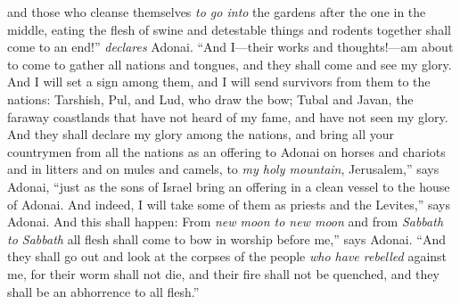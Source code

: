 \begin{biblechapter}
and those who cleanse themselves \textit{to go into} the gardens after the one in the middle, 
eating the flesh of swine 
and detestable things and rodents together shall come to an end!” \textit{declares} Adonai.
\verse “And I—their works and thoughts!—am about to come to gather all nations and tongues, 
and they shall come and see my glory.
\verse And I will set a sign among them, 
and I will send survivors from them to the nations: 
Tarshish, Pul, and Lud, who draw the bow; 
Tubal and Javan, the faraway coastlands 
that have not heard of my fame, 
and have not seen my glory.
\verse And they shall declare my glory among the nations,
\verse and bring all your countrymen from all the nations as an offering to Adonai on horses and chariots and in litters and on mules and camels, to \textit{my holy mountain}, Jerusalem,” says Adonai, “just as the sons of Israel bring an offering in a clean vessel to the house of Adonai.
\verse And indeed, I will take some of them as priests and the Levites,” says Adonai.
\verse And this shall happen: From \textit{new moon to new moon} and from \textit{Sabbath to Sabbath} all flesh shall come to bow in worship before me,” says Adonai.
\verse “And they shall go out and look at the corpses of the people \textit{who have rebelled} against me, for their worm shall not die, 
and their fire shall not be quenched, 
and they shall be an abhorrence to all flesh.”
\end{biblechapter}


